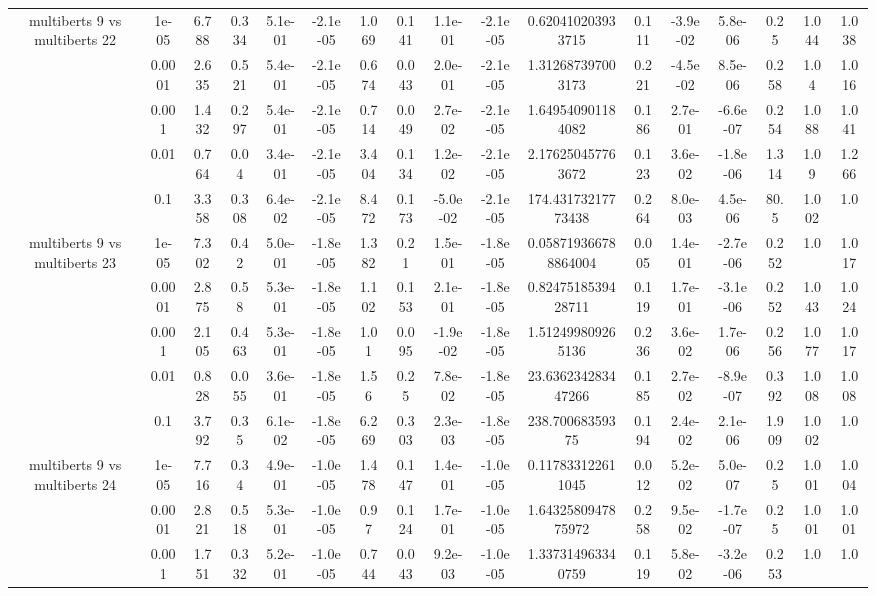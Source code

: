\begin{tabular}{|c|c|c|c|c|c|c|c|c|c|c|c|c|c|c|c|c|}
\hline
\multirow{5}{*}{multiberts 9 vs multiberts 22} & 1e-05 & 6.788 & 0.334 & 5.1e-01 & -2.1e-05 & 1.069 & 0.141 & 1.1e-01 & -2.1e-05 & 0.620410203933715 & 0.111 & -3.9e-02 & 5.8e-06 & 0.25 & 1.044 & 1.038 \\
 & 0.0001 & 2.635 & 0.521 & 5.4e-01 & -2.1e-05 & 0.674 & 0.043 & 2.0e-01 & -2.1e-05 & 1.312687397003173 & 0.221 & -4.5e-02 & 8.5e-06 & 0.258 & 1.04 & 1.016 \\
 & 0.001 & 1.432 & 0.297 & 5.4e-01 & -2.1e-05 & 0.714 & 0.049 & 2.7e-02 & -2.1e-05 & 1.649540901184082 & 0.186 & 2.7e-01 & -6.6e-07 & 0.254 & 1.088 & 1.041 \\
 & 0.01 & 0.764 & 0.04 & 3.4e-01 & -2.1e-05 & 3.404 & 0.134 & 1.2e-02 & -2.1e-05 & 2.176250457763672 & 0.123 & 3.6e-02 & -1.8e-06 & 1.314 & 1.09 & 1.266 \\
 & 0.1 & 3.358 & 0.308 & 6.4e-02 & -2.1e-05 & 8.472 & 0.173 & -5.0e-02 & -2.1e-05 & 174.43173217773438 & 0.264 & 8.0e-03 & 4.5e-06 & 80.5 & 1.002 & 1.0 \\
\hline
\multirow{5}{*}{multiberts 9 vs multiberts 23} & 1e-05 & 7.302 & 0.42 & 5.0e-01 & -1.8e-05 & 1.382 & 0.21 & 1.5e-01 & -1.8e-05 & 0.058719366788864004 & 0.005 & 1.4e-01 & -2.7e-06 & 0.252 & 1.0 & 1.017 \\
 & 0.0001 & 2.875 & 0.58 & 5.3e-01 & -1.8e-05 & 1.102 & 0.153 & 2.1e-01 & -1.8e-05 & 0.8247518539428711 & 0.119 & 1.7e-01 & -3.1e-06 & 0.252 & 1.043 & 1.024 \\
 & 0.001 & 2.105 & 0.463 & 5.3e-01 & -1.8e-05 & 1.01 & 0.095 & -1.9e-02 & -1.8e-05 & 1.512499809265136 & 0.236 & 3.6e-02 & 1.7e-06 & 0.256 & 1.077 & 1.017 \\
 & 0.01 & 0.828 & 0.055 & 3.6e-01 & -1.8e-05 & 1.56 & 0.25 & 7.8e-02 & -1.8e-05 & 23.636234283447266 & 0.185 & 2.7e-02 & -8.9e-07 & 0.392 & 1.008 & 1.008 \\
 & 0.1 & 3.792 & 0.35 & 6.1e-02 & -1.8e-05 & 6.269 & 0.303 & 2.3e-03 & -1.8e-05 & 238.70068359375 & 0.194 & 2.4e-02 & 2.1e-06 & 1.909 & 1.002 & 1.0 \\
\hline
\multirow{5}{*}{multiberts 9 vs multiberts 24} & 1e-05 & 7.716 & 0.34 & 4.9e-01 & -1.0e-05 & 1.478 & 0.147 & 1.4e-01 & -1.0e-05 & 0.117833122611045 & 0.012 & 5.2e-02 & 5.0e-07 & 0.25 & 1.001 & 1.004 \\
 & 0.0001 & 2.821 & 0.518 & 5.3e-01 & -1.0e-05 & 0.97 & 0.124 & 1.7e-01 & -1.0e-05 & 1.6432580947875972 & 0.258 & 9.5e-02 & -1.7e-07 & 0.25 & 1.001 & 1.001 \\
 & 0.001 & 1.751 & 0.332 & 5.2e-01 & -1.0e-05 & 0.744 & 0.043 & 9.2e-03 & -1.0e-05 & 1.337314963340759 & 0.119 & 5.8e-02 & -3.2e-06 & 0.253 & 1.0 & 1.0 \\

\end{tabular}
